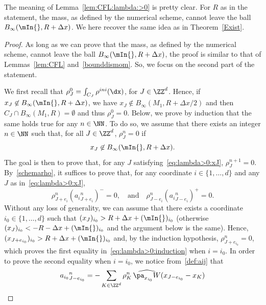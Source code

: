 The meaning of Lemma~\ref{lem:CFL:lambda:>0} is pretty clear. For $R$ as in the statement, the mass, as defined by the numerical scheme, cannot leave the ball $B_{\infty}(\mIn{},R+\Delta x)$. We here recover the same idea as in Theorem~\ref{Exist}.

\begin{proof}
As long as we can prove that the mass, as defined by the numerical scheme, cannot leave the ball $B_{\infty}(\mIn{},R+\Delta x)$, the proof is similar to that of Lemmas~\ref{lem:CFL} and~\ref{bounddismom}. So, we focus on the second part of the statement.

We first recall that $\rho^0_{J} = \int_{C_{J}}\rho^{ini}(\dx)$, for $J \in \ZZ^d$. Hence, if $x_{J} \not \in B_{\infty}(\mIn{},R+\Delta x)$, we have $x_{J} \not \in B_{\infty}(M_{1},R+\Delta x/2)$ and then $C_{J} \cap B_{\infty}(M_{1},R) = \emptyset$ and thus $\rho^0_{J}=0$. Below, we prove by induction that the same holds true for any $n \in \NN$. To do so, we assume that there exists an integer $n \in \NN$ such that, for all $J \in \ZZ^d$, $\rho^n_{J} =0$ if
\begin{equation}\label{eq:lambda>0:xJ}
x_{J} \not \in B_{\infty}(\mIn{},R + \Delta x).
\end{equation}
The goal is then to prove that, for any $J$ satisfying~\eqref{eq:lambda>0:xJ}, $\rho^{n+1}_{J}=0$. By~\eqref{schemarho}, it suffices to prove that, for any coordinate $i \in \{1,\dots,d\}$ and any $J$ as in~\eqref{eq:lambda>0:xJ},
\begin{equation}\label{eq:lambda>0:induction}
\rho^{n}_{J+e_{i}} ({a_{i}}^n_{J+e_{i}})^- = 0,
\quad \text{and}
\quad
\rho^{n}_{J-e_{i}} ({a_{i}}^n_{J-e_{i}})^+ = 0.
\end{equation}
Without any loss of generality, we can assume that there exists a coordinate $i_{0} \in \{1,\dots,d\}$ such that $(x_{J})_{i_{0}} > R + \Delta x + (\mIn{})_{i_{0}}$ (otherwise $(x_{J})_{i_{0}} < -R - \Delta x+ (\mIn{})_{i_{0}}$ and the argument below is the same). Hence, $(x_{J+e_{i_{0}}})_{i_{0}} > R + \Delta x + (\mIn{})_{i_{0}}$ and, by the induction hypothesis, $\rho^n_{J+e_{i_{0}}}=0$, which proves the first equality in~\eqref{eq:lambda>0:induction} when $i=i_{0}$. In order to prove the second equality when $i=i_{0}$, we notice from~\eqref{def:aij} that
\begin{equation*}
\begin{split}
{a_{i_{0}}}^n_{J-e_{i_{0}}} & = -\sum_{K\in \ZZ^d} \rho_{K}^n \, \widehat{\pa_{x_{i_{0}}} W}(x_{J-e_{i_{0}}}-x_K ) \\

\end{split}
\end{equation*}
\end{proof}
